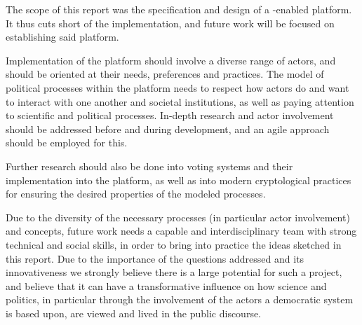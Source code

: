 The scope of this report was the specification and design of a -enabled  platform. It thus cuts short of the implementation, and future work will be focused on establishing said platform. 

Implementation of the platform should involve a diverse range of actors, and should be oriented at their needs, preferences and practices. The model of political processes within the platform needs to respect how actors do and want to interact with one another and societal institutions, as well as paying attention to scientific and political processes. In-depth research and actor involvement should be addressed before and during development, and an agile approach should be employed for this. 

Further research should also be done into voting systems and their implementation into the platform, as well as into modern cryptological practices for ensuring the desired properties of the modeled processes.

Due to the diversity of the necessary processes (in particular actor involvement) and concepts, future work needs a capable and interdisciplinary team with strong technical and social skills, in order to bring into practice the ideas sketched in this report. Due to the importance of the questions addressed and its innovativeness we strongly believe there is a large potential for such a project, and believe that it can have a transformative influence on how science and  politics, in particular through the involvement of the actors a democratic system is based upon, are viewed and lived in the public discourse.